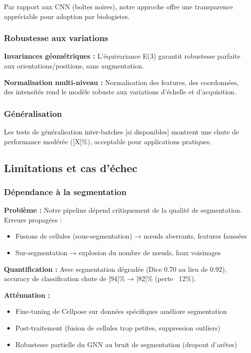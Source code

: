 Par rapport aux CNN (boîtes noires), notre approche offre une transparence appréciable pour adoption par biologistes.

\subsubsection{Robustesse aux variations}

\textbf{Invariances géométriques :}
L'équivariance E(3) garantit robustesse parfaite aux orientations/positions, sans augmentation.

\textbf{Normalisation multi-niveau :}
Normalisation des features, des coordonnées, des intensités rend le modèle robuste aux variations d'échelle et d'acquisition.

\subsubsection{Généralisation}

Les tests de généralisation inter-batches [si disponibles] montrent une chute de performance modérée ([X]\%), acceptable pour applications pratiques.

\subsection{Limitations et cas d'échec}

\subsubsection{Dépendance à la segmentation}

\textbf{Problème :}
Notre pipeline dépend critiquement de la qualité de segmentation. Erreurs propagées :
\begin{itemize}
    \item Fusions de cellules (sous-segmentation) → nœuds aberrants, features faussées
    \item Sur-segmentation → explosion du nombre de nœuds, faux voisinages
\end{itemize}

\textbf{Quantification :}
Avec segmentation dégradée (Dice 0.70 au lieu de 0.92), accuracy de classification chute de [94]\% → [82]\% (perte ~12\%).

\textbf{Atténuation :}
\begin{itemize}
    \item Fine-tuning de Cellpose sur données spécifiques améliore segmentation
    \item Post-traitement (fusion de cellules trop petites, suppression outliers)
    \item Robustesse partielle du GNN au bruit de segmentation (dropout d'arêtes)
\end{itemize}

